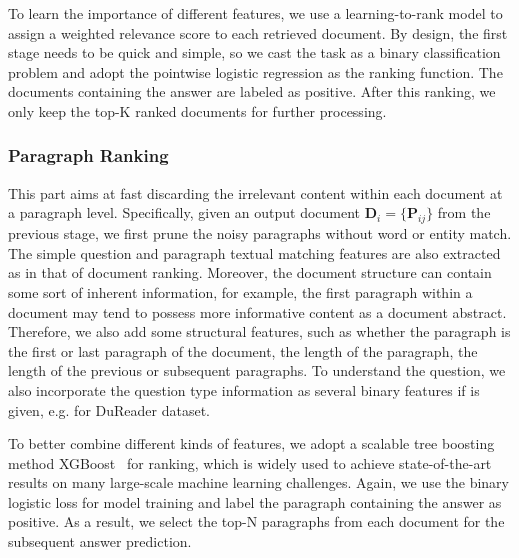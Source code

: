 \documentclass[letterpaper]{article} \usepackage{aaai19}  \usepackage{graphicx}
\begin{document}
To learn the importance of different features, we use a learning-to-rank model to assign a weighted relevance score to each retrieved document. By design, the first stage needs to be quick and simple, so we cast the task as a binary classification problem and adopt the pointwise logistic regression as the ranking function. The documents containing the answer are labeled as positive. After this ranking, we only keep the top-K ranked documents for further processing. 

\subsubsection{Paragraph Ranking}
This part aims at fast discarding the irrelevant content within each document at a paragraph level. Specifically, given an output document $\textbf{D}_i=\{\textbf{P}_{ij}\}$ from the previous stage, we first prune the noisy paragraphs without word or entity match. The simple question and paragraph textual matching features are also extracted as in that of document ranking. Moreover, the document structure can contain some sort of inherent information, for example, the first paragraph within a document may tend to possess more informative content as a document abstract. Therefore, we also add some structural features, such as whether the paragraph is the first or last paragraph of the document, the length of the paragraph, the length of the previous or subsequent paragraphs. To understand the question, we also incorporate the question type information as several binary features if is given, e.g. for DuReader dataset. 

To better combine different kinds of features, we adopt a scalable tree boosting method XGBoost~\cite{chen2016xgboost} for ranking, which is widely used to achieve state-of-the-art results on many large-scale machine learning challenges. Again, we use the binary logistic loss for model training and label the paragraph containing the answer as positive. As a result, we select the top-N paragraphs from each document for the subsequent answer prediction. 
\end{document}
